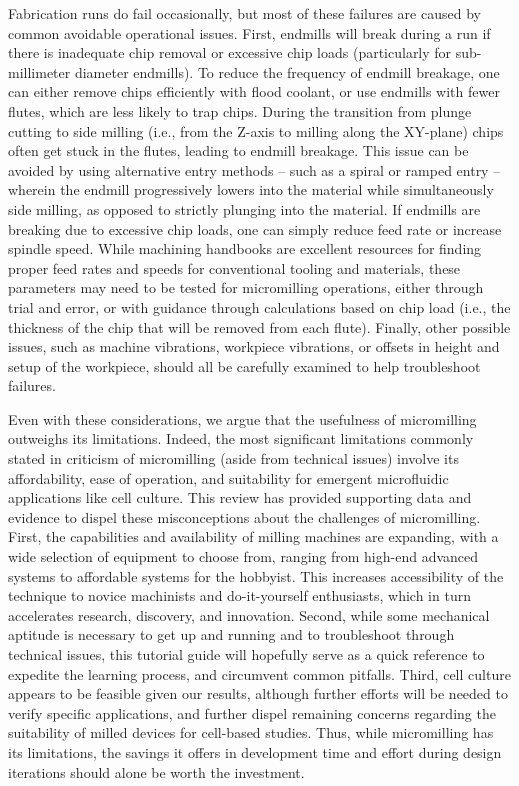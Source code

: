 Fabrication runs do fail occasionally, but most of these failures are caused by common avoidable operational issues. First, endmills will break during a run if there is inadequate chip removal or excessive chip loads (particularly for sub-millimeter diameter endmills). To reduce the frequency of endmill breakage, one can either remove chips efficiently with flood coolant, or use endmills with fewer flutes, which are less likely to trap chips. During the transition from plunge cutting to side milling (i.e., from the Z-axis to milling along the XY-plane) chips often get stuck in the flutes, leading to endmill breakage. This issue can be avoided by using alternative entry methods -- such as a spiral or ramped entry -- wherein the endmill progressively lowers into the material while simultaneously side milling, as opposed to strictly plunging into the material. If endmills are breaking due to excessive chip loads, one can simply reduce feed rate or increase spindle speed. While machining handbooks are excellent resources for finding proper feed rates and speeds for conventional tooling and materials, these parameters may need to be tested for micromilling operations, either through trial and error, or with guidance through calculations based on chip load (i.e., the thickness of the chip that will be removed from each flute). Finally, other possible issues, such as machine vibrations, workpiece vibrations, or offsets in height and setup of the workpiece, should all be carefully examined to help troubleshoot failures. 	

Even with these considerations, we argue that the usefulness of micromilling outweighs its limitations. Indeed, the most significant limitations commonly stated in criticism of micromilling (aside from technical issues) involve its affordability, ease of operation, and suitability for emergent microfluidic applications like cell culture. This review has provided supporting data and evidence to dispel these misconceptions about the challenges of micromilling. First, the capabilities and availability of milling machines are expanding, with a wide selection of equipment to choose from, ranging from high-end advanced systems to affordable systems for the hobbyist. This increases accessibility of the technique to novice machinists and do-it-yourself enthusiasts, which in turn accelerates research, discovery, and innovation. Second, while some mechanical aptitude is necessary to get up and running and to troubleshoot through technical issues, this tutorial guide will hopefully serve as a quick reference to expedite the learning process, and circumvent common pitfalls. Third, cell culture appears to be feasible given our results, although further efforts will be needed to verify specific applications, and further dispel remaining concerns regarding the suitability of milled devices for cell-based studies. Thus, while micromilling has its limitations, the savings it offers in development time and effort during design iterations should alone be worth the investment.

